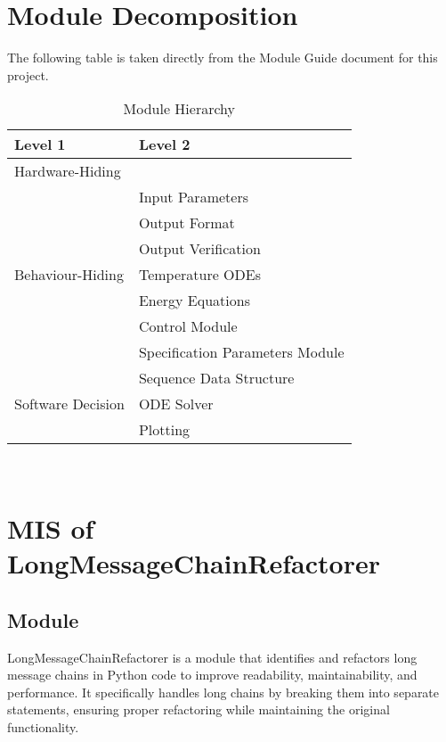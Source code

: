 \documentclass[12pt, titlepage]{article}
\begin{document}
\section{Module Decomposition}

The following table is taken directly from the Module Guide document for this project.

\begin{table}[h!]
\centering
\begin{tabular}{p{} p{}}
\toprule
\textbf{Level 1} & \textbf{Level 2}\\
\midrule

{Hardware-Hiding} & ~ \\
\midrule

\multirow{7}{0.3\textwidth}{Behaviour-Hiding} & Input Parameters\\
& Output Format\\
& Output Verification\\
& Temperature ODEs\\
& Energy Equations\\ 
& Control Module\\
& Specification Parameters Module\\
\midrule

\multirow{3}{0.3\textwidth}{Software Decision} & {Sequence Data Structure}\\
& ODE Solver\\
& Plotting\\
\bottomrule

\end{tabular}
\caption{Module Hierarchy}
\label{TblMH}
\end{table}

\newpage

~\newpage

\section{MIS of LongMessageChainRefactorer}

\subsection{Module}

LongMessageChainRefactorer is a module that identifies and refactors 
long message chains in Python code to improve readability, maintainability,
and performance. It specifically handles long chains by breaking them into 
separate statements, ensuring proper refactoring while maintaining the 
original functionality.
\end{document}
